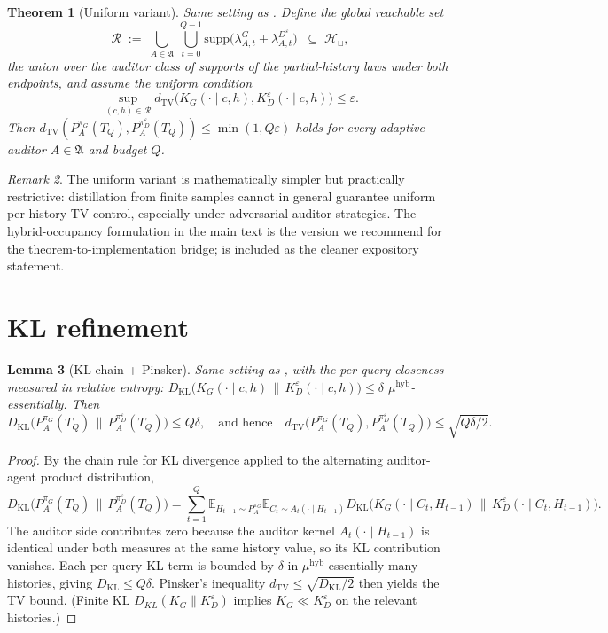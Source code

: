 \documentclass{article}
\theoremstyle{plain}
\newtheorem{theorem}{Theorem}
\newtheorem{lemma}[theorem]{Lemma}
\theoremstyle{definition}
\theoremstyle{remark}
\newtheorem{remark}[theorem]{Remark}
\newcommand{\TV}{\mathrm{TV}}
\newcommand{\KL}{\mathrm{KL}}
\newcommand{\dtv}{d_{\TV}}
\newcommand{\dkl}{D_{\KL}}
\newcommand{\Hist}{\mathcal{H}}
\newcommand{\PpiA}[1]{P_A^{\pi_{#1}}}
\begin{document}
\begin{theorem}[Uniform variant]\label{thm:approx-uniform}
Same setting as . Define the \emph{global reachable set}
\[
\mathcal R \;:=\; \bigcup_{A \in \mathfrak{A}}\, \bigcup_{t = 0}^{Q-1}
  \mathrm{supp}\big(\lambda_{A, t}^G + \lambda_{A, t}^{D^\varepsilon}\big)
  \;\;\subseteq\; \Hist_\sqcup,
\]
the union over the auditor class of supports of the partial-history laws
under both endpoints, and assume the uniform condition
\[
\sup_{(c, h) \in \mathcal R}
\dtv\big(K_G(\cdot \mid c, h), K_D^\varepsilon(\cdot \mid c, h)\big) \le \varepsilon.
\]
Then $\dtv(\PpiA{G}(T_Q), P_A^{\pi_D^\varepsilon}(T_Q)) \le \min(1, Q\varepsilon)$
holds for \emph{every} adaptive auditor $A \in \mathfrak A$ and budget $Q$.
\end{theorem}

\begin{remark}
The uniform variant is mathematically simpler but practically restrictive:
distillation from finite samples cannot in general guarantee uniform per-history
TV control, especially under adversarial auditor strategies. The
hybrid-occupancy formulation in the main text is the version we recommend
for the theorem-to-implementation bridge;  is included
as the cleaner expository statement.
\end{remark}

\section{KL refinement}\label{app:kl}

\begin{lemma}[KL chain + Pinsker]\label{lem:kl}
Same setting as , with the per-query closeness measured in
relative entropy:
$\dkl\big(K_G(\cdot \mid c, h) \,\|\, K_D^\varepsilon(\cdot \mid c, h)\big) \le \delta$
$\mu^{\mathrm{hyb}}$-essentially. Then
\[
\dkl\big(\PpiA{G}(T_Q) \,\|\, P_A^{\pi_D^\varepsilon}(T_Q)\big) \le Q\delta,
\quad\text{and hence}\quad
\dtv\big(\PpiA{G}(T_Q), P_A^{\pi_D^\varepsilon}(T_Q)\big) \le \sqrt{Q\delta / 2}.
\]
\end{lemma}

\begin{proof}
By the chain rule for KL divergence applied to the alternating auditor-agent
product distribution,
\[
\dkl\big(\PpiA{G}(T_Q) \,\|\, P_A^{\pi_D^\varepsilon}(T_Q)\big)
= \sum_{t=1}^Q \mathbb{E}_{H_{t-1} \sim P_A^{\pi_G}}
  \mathbb{E}_{C_t \sim A_t(\cdot \mid H_{t-1})}\!
  \dkl\!\big(K_G(\cdot \mid C_t, H_{t-1}) \,\|\, K_D^\varepsilon(\cdot \mid C_t, H_{t-1})\big).
\]
The auditor side contributes zero because the auditor kernel
$A_t(\cdot \mid H_{t-1})$ is identical under both measures at the same
history value, so its KL contribution vanishes. Each per-query KL term is
bounded by $\delta$ in $\mu^{\mathrm{hyb}}$-essentially many histories,
giving $\dkl \le Q\delta$. Pinsker's inequality
$\dtv \le \sqrt{\dkl / 2}$ then yields the TV bound. (Finite KL
$D_{KL}(K_G \| K_D^\varepsilon)$ implies $K_G \ll K_D^\varepsilon$ on the
relevant histories.)
\end{proof}
\end{document}
